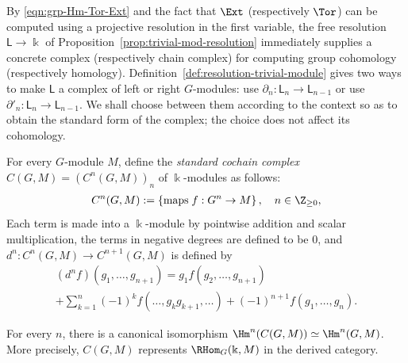 By \eqref{eqn:grp-Hm-Tor-Ext} and the fact that $\Ext$ (respectively $\Tor$)
can be computed using a projective resolution in the first variable, the free
resolution $\mathsf{L}\to\Bbbk$ of
Proposition~\ref{prop:trivial-mod-resolution} immediately supplies a concrete
complex (respectively chain complex) for computing group cohomology
(respectively homology). Definition~\ref{def:resolution-trivial-module} gives
two ways to make $\mathsf{L}$ a complex of left or right $G$-modules: use
$\partial_n:\mathsf{L}_n\to\mathsf{L}_{n-1}$ or use
$\partial'_n:\mathsf{L}_n\to\mathsf{L}_{n-1}$. We shall choose between them
according to the context so as to obtain the standard form of the complex;
the choice does not affect its cohomology.

\begin{proposition}
\label{prop:groupcoh-cochain}
	For every $G$-module $M$, define the \emph{standard cochain complex}
	$C(G,M)=(C^n(G,M))_n$ of $\Bbbk$-modules as follows:
	\begin{gather*}
		C^n(G, M) := \left\{ \text{maps}\; f: G^n \to M \right\}, \quad n \in \Z_{\geq 0},
	\end{gather*}
	Each term is made into a $\Bbbk$-module by pointwise addition and scalar
	multiplication, the terms in negative degrees are defined to be $0$, and
	$d^n:C^n(G,M)\to C^{n+1}(G,M)$ is defined by
	\begin{multline*}
		(d^n f)(g_1, \ldots, g_{n+1}) = g_1 f(g_2, \ldots, g_{n+1}) \\
		+ \sum_{k=1}^n (-1)^k f(\ldots, g_k g_{k+1}, \ldots) + (-1)^{n+1} f(g_1, \ldots, g_n).
	\end{multline*}

	For every $n$, there is a canonical isomorphism
	$\Hm^n(C(G,M))\simeq\Hm^n(G,M)$. More precisely, $C(G,M)$ represents
	$\RHom_G(\Bbbk,M)$ in the derived category.
\end{proposition}
